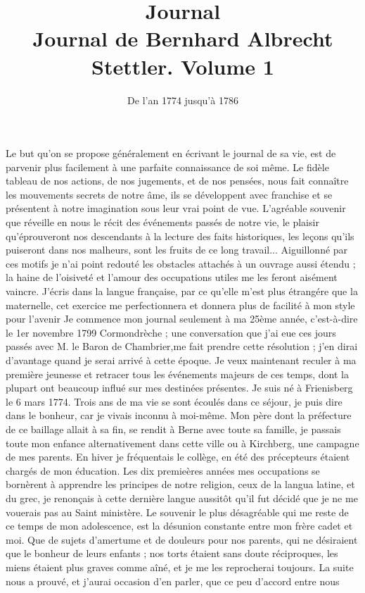 \documentclass[12pt]{article}
\title{Journal\\[0.5em]\large Journal de Bernhard Albrecht Stettler. Volume 1}
\author{}
\date{De l'an 1774 jusqu'\`a 1786}
\begin{document}
\maketitle

Le but qu’on se propose généralement en écrivant le journal de sa vie, est de parvenir plus
facilement à une parfaite connaissance de soi même. Le fidèle tableau de nos actions, de nos
jugements, et de nos pensées, nous fait connaître les mouvements secrets de notre âme, ils se
développent avec franchise et se présentent à notre imagination sous leur vrai point de vue.
L’agréable souvenir que réveille en nous le récit des événements passés de notre vie, le plaisir
qu’éprouveront nos descendants à la lecture des faits historiques, les leçons qu’ils puiseront dans
nos malheurs, sont les fruits de ce long travail... Aiguillonné par ces motifs je n’ai point redouté
les obstacles attachés à un ouvrage aussi étendu ; la haine de l’oisiveté et l’amour des occupations
utiles me les feront aisément vaincre. J’écris dans la langue française, par ce qu’elle m’est plus
étrangére que la maternelle, cet exercice me perfectionnera et donnera plus de facilité à mon style
pour l’avenir Je commence mon journal seulement à ma 25ème année, c’est-à-dire le 1er novembre 1799
Cormondrèche ; une conversation que j’ai eue ces jours passés avec M. le Baron de Chambrier,me fait
prendre cette résolution ; j’en dirai d’avantage quand je serai arrivé à cette époque. Je veux
maintenant reculer à ma première jeunesse et retracer tous les événements majeurs de ces temps, dont
la plupart ont beaucoup influé sur mes destinées présentes. Je suis né à Frienisberg le 6 mars 1774.
Trois ans de ma vie se sont écoulés dans ce séjour, je puis dire dans le bonheur, car je vivais
inconnu à moi-même. Mon père dont la préfecture de ce baillage allait à sa fin, se rendit à Berne
avec toute sa famille, je passais toute mon enfance alternativement dans cette ville ou à Kirchberg,
une campagne de mes parents. En hiver je fréquentais le collège, en été des précepteurs étaient
chargés de mon éducation. Les dix premieères années mes occupations se bornèrent à apprendre les
principes de notre religion, ceux de la langua latine, et du grec, je renonçais à cette dernière
langue aussitôt qu’il fut décidé que je ne me vouerais pas au Saint ministère. Le souvenir le plus
désagréable qui me reste de ce temps de mon adolescence, est la désunion constante entre mon frère
cadet et moi. Que de sujets d’amertume et de douleurs pour nos parents, qui ne désiraient que le
bonheur de leurs enfants ; nos torts étaient sans doute réciproques, les miens étaient plus graves
comme aîné, et je me les reprocherai toujours. La suite nous a prouvé, et j’aurai occasion d’en
parler, que ce peu d’accord entre nous
\end{document}

